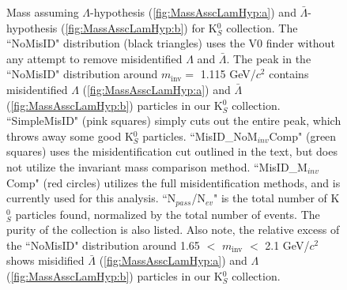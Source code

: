 \documentclass[../AnalysisNoteJBuxton.tex]{subfiles}
\begin{document}
\begin{figure}[h!]
  \centering
  \caption[$\Lambda$($\bar{\Lambda}$) contamination in K$^{0}_{S}$ collection]{Mass assuming $\Lambda$-hypothesis (\ref{fig:MassAsscLamHyp:a}) and $\bar{\Lambda}$-hypothesis (\ref{fig:MassAsscLamHyp:b}) for K$^{0}_{S}$ collection.
  The ``NoMisID" distribution (black triangles) uses the V0 finder without any attempt to remove misidentified $\Lambda$ and $\bar{\Lambda}$.
  The peak in the ``NoMisID" distribution around $m_{\mathrm{inv}} = $ 1.115 GeV/$c^{2}$ contains misidentified $\Lambda$ (\ref{fig:MassAsscLamHyp:a}) and $\bar{\Lambda}$ (\ref{fig:MassAsscLamHyp:b}) particles in our K$^{0}_{S}$ collection.  
  ``SimpleMisID" (pink squares) simply cuts out the entire peak, which throws away some good K$^{0}_{S}$ particles.
  ``MisID\_NoM$_{inv}$Comp" (green squares) uses the misidentification cut outlined in the text, but does not utilize the invariant mass comparison method.
  ``MisID\_M$_{inv}$Comp" (red circles) utilizes the full misidentification methods, and is currently used for this analysis.
  ``N$_{pass}$/N$_{ev}$" is the total number of K$^{0}_{S}$ particles found, normalized by the total number of events.  The purity of the collection is also listed. 
  Also note, the relative excess of the ``NoMisID" distribution around 1.65 $<$ $m_{\mathrm{inv}}$ $<$ 2.1 GeV/$c^{2}$ shows misidified $\bar{\Lambda}$ (\ref{fig:MassAsscLamHyp:a}) and $\Lambda$ (\ref{fig:MassAsscLamHyp:b}) particles in our K$^{0}_{S}$ collection.}
  \label{fig:MassAsscLamHyp}
\end{figure}
\end{document}
